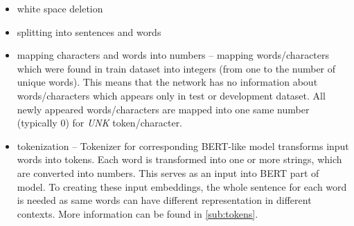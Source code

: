 \begin{itemize}
\item white space deletion
\item splitting into sentences and words
\item mapping characters and words into numbers -- mapping  words/characters which were found in train dataset into integers (from one to the number of unique words). This means that the network has no information about words/characters which appears only in test or development dataset. All newly appeared words/characters are mapped into one same number (typically $0$) for \textit{UNK} token/character.
\item tokenization -- Tokenizer for corresponding BERT-like model transforms input words into tokens. Each word is transformed into one or more strings, which are converted into numbers. This serves as an input into BERT part of model. To creating these input embeddings, the whole sentence for each word is needed as same words can have different representation in different contexts. More information can be found in \ref{sub:tokens}.
\end{itemize}

